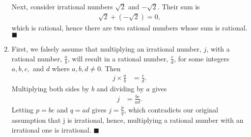 \documentclass[12pt]{article}
\begin{document}
\begin{enumerate}
          Next, consider irrational numbers $\sqrt2$ and $-\sqrt2$. Their sum is 
          \begin{align*}
            \sqrt2 + (-\sqrt2) = 0,
          \end{align*}
          which is rational, hence there are two rational numbers whose sum is 
          rational. \hfill $\blacksquare$ 
          \item First, we falsely assume that multiplying an 
          irrational number, $j$, with a rational number, $\frac{a}{b}$, will result 
          in a rational number, $\frac{c}{d}$, for some integers $a,b,c, $ and $d$ 
          where $a,b,d \neq 0$. Then 
          \begin{align*}
            j \times \frac{a}{b} &= \frac{c}{d}.
          \end{align*}
          Multiplying both sides by $b$ and dividing by $a$ gives
          \begin{align*}
            j &= \frac{bc}{ad}.
          \end{align*}
          Letting $p = bc$ and $q = ad$ gives $j = \frac{p}{q}$, which contradicts 
          our original assumption that j is irrational, hence, multiplying a rational 
          number with an irrational one is irrational. \hfill $\blacksquare$


\end{enumerate}
\end{document}

